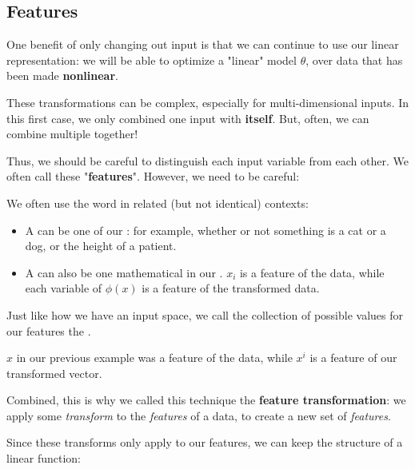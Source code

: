     \subsecdiv

    \subsection*{Features}
        
        One benefit of only changing out input is that we can continue to use our linear representation: we will be able to optimize a "linear" model $\theta$, over data that has been made \textbf{nonlinear}.

        These transformations can be complex, especially for multi-dimensional inputs. In this first case, we only combined one input with \textbf{itself}. But, often, we can combine multiple together!

        Thus, we should be careful to distinguish each input variable from each other. We often call these "\textbf{features}". However, we need to be careful:\\

        \begin{clarification}
            We often use the word  in related (but not identical) contexts:

            \begin{itemize}
                \item A  can be one  of our : for example, whether or not something is a cat or a dog, or the height of a patient. 

                \item A  can also be one mathematical  in our . $x_i$ is a feature of the data, while each variable of $\phi(x)$ is a feature of the transformed data.
            \end{itemize}

            Just like how we have an input space, we call the collection of possible values for our features the .
        \end{clarification}

        \miniex $x$ in our previous example was a feature of the data, while $x^i$ is a feature of our transformed vector.
    
        Combined, this is why we called this technique the \textbf{feature transformation}: we apply some \textit{transform} to the \textit{features} of a data, to create a new set of \textit{features}.

        Since these transforms only apply to our features, we can keep the structure of a linear function:\\

